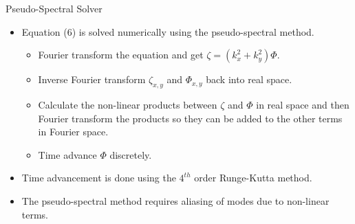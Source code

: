 \documentclass[aspectratio=43]{beamer}
\begin{document}
   \begin{frame}{Pseudo-Spectral Solver}
      \begin{itemize}
         \item Equation (6) is solved numerically using the pseudo-spectral method.
            \begin{itemize}
               \item Fourier transform the equation and get $\zeta=(k_x^2 + k_y^2)\Phi$.
               \item Inverse Fourier transform $\zeta_{x,y}$ and $\Phi_{x,y}$ back into real space.
               \item Calculate the non-linear products between $\zeta$ and $\Phi$ in real space and then Fourier transform the
               products so they can be added to the other terms in Fourier space.
               \item Time advance $\Phi$ discretely.
            \end{itemize}
         \vspace{5mm}
         \item Time advancement is done using the $4^{th}$ order Runge-Kutta method.
         \vspace{5mm}
         \item The pseudo-spectral method requires aliasing of modes due to non-linear terms.
      \end{itemize}
   \end{frame}
\end{document}
